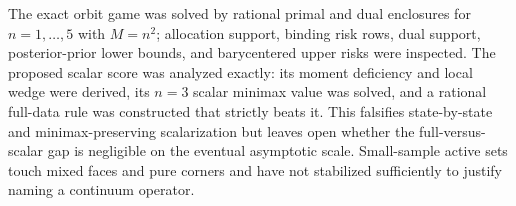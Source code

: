 The exact orbit game was solved by rational primal and dual enclosures for \(n=1,\ldots,5\) with \(M=n^2\); allocation support, binding risk rows, dual support, posterior-prior lower bounds, and barycentered upper risks were inspected.  The proposed scalar score was analyzed exactly: its moment deficiency and local wedge were derived, its \(n=3\) scalar minimax value was solved, and a rational full-data rule was constructed that strictly beats it.  This falsifies state-by-state and minimax-preserving scalarization but leaves open whether the full-versus-scalar gap is negligible on the eventual asymptotic scale.  Small-sample active sets touch mixed faces and pure corners and have not stabilized sufficiently to justify naming a continuum operator.